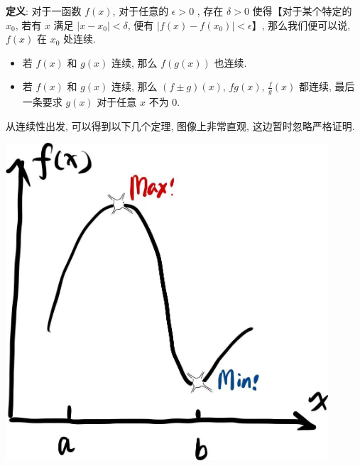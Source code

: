 \begin{tcolorbox}[size=fbox, breakable, enhanced jigsaw, title={连续性 (continuity)}]

\textbf{定义}: 对于一函数 $f(x)$, 对于任意的 $\epsilon>0$ , 存在
$\delta>0$ 使得【对于某个特定的 $x_0$, 若有 $x$ 满足
$|x-x_0|<\delta$, 便有 $|f(x)-f(x_0)|<\epsilon$】, 那么我们便可以说,
$f(x)$ 在 $x_0$ 处连续.

\begin{itemize}

\item
  若 $f(x)$ 和 $g(x)$ 连续, 那么 $f(g(x))$ 也连续.
\item
  若 $f(x)$ 和 $g(x)$ 连续, 那么 $(f\pm g)(x)$, $fg(x)$,
  $\frac{f}{g}(x)$ 都连续, 最后一条要求 $g(x)$ 对于任意 $x$ 不为
  $0$.
\end{itemize}

从连续性出发, 可以得到以下几个定理, 图像上非常直观, 这边暂时忽略严格证明.

\begin{tcolorbox}[size=fbox, breakable, enhanced jigsaw, title={极值定理 (extreme value theorem)}]

\begin{tcolorbox}[size=fbox, breakable, enhanced jigsaw, sidebyside]
\includegraphics[width=0.9\textwidth]{img/image-20230503152124313.png}
\tcblower
{}
\end{tcolorbox}


\end{tcolorbox}
\end{tcolorbox}
